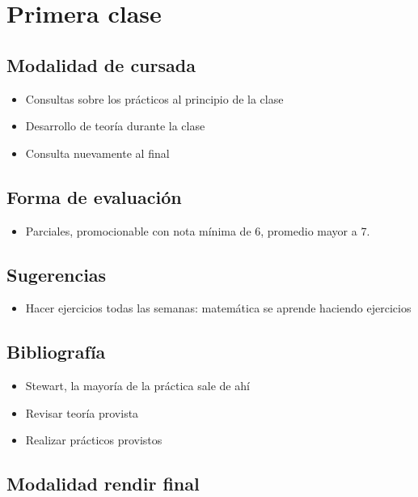 \section{Primera clase}

\subsection{Modalidad de cursada}

\begin{itemize}
    \item Consultas sobre los prácticos al principio de la clase
    \item Desarrollo de teoría durante la clase
    \item Consulta nuevamente al final
\end{itemize}

\subsection{Forma de evaluación}

\begin{itemize}
    \item Parciales, promocionable con nota mínima de 6, promedio mayor a 7.
\end{itemize}

\subsection{Sugerencias}

\begin{itemize}
    \item Hacer ejercicios todas las semanas: matemática se aprende haciendo
          ejercicios
\end{itemize}

\subsection{Bibliografía}

\begin{itemize}
    \item Stewart, la mayoría de la práctica sale de ahí
    \item Revisar teoría provista
    \item Realizar prácticos provistos
\end{itemize}

\subsection{Modalidad rendir final}

